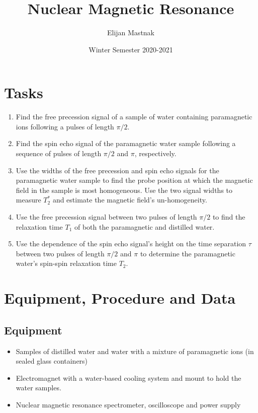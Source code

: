 \documentclass[11pt, a4paper]{article}
\begin{document}
\title{Nuclear Magnetic Resonance}
\author{Elijan Mastnak}
\date{Winter Semester 2020-2021}
\maketitle
	
\section{Tasks}
\begin{enumerate}
	\item Find the free precession signal of a sample of water containing paramagnetic ions following a pulses of length $ \pi/2 $.
	
	\item Find the spin echo signal of the paramagnetic water sample following a sequence of pulses of length $ \pi/2 $ and $ \pi $, respectively.
	
	\item Use the widths of the free precession and spin echo signals for the paramagnetic water sample to find the probe position at which the magnetic field in the sample is most homogeneous. Use the two signal widths to measure $ T_{2}^{*} $ and estimate the magnetic field's un-homogeneity.
	
	\item Use the free precession signal between two pulses of length $ \pi/2 $ to find the relaxation time $ T_{1} $ of both the paramagnetic and distilled water.
	
	\item Use the dependence of the spin echo signal's height on the time separation $ \tau $ between two pulses of length $ \pi/2 $ and $ \pi $ to determine the paramagnetic water's spin-spin relaxation time $ T_{2} $.

\end{enumerate}

\section{Equipment, Procedure and Data}

\subsection{Equipment}
\begin{itemize}
	\item Samples of distilled water and water with a mixture of paramagnetic ions (in sealed glass containers)
	
	\item Electromagnet with a water-based cooling system and mount to hold the water samples.
	
	\item Nuclear magnetic resonance spectrometer, oscilloscope and power supply

\end{itemize}
\end{document}
